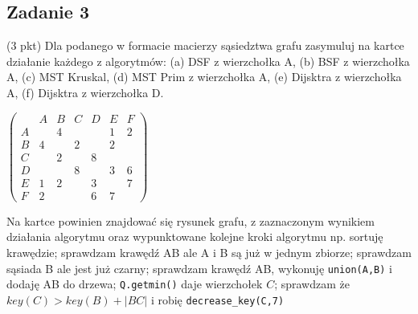\documentclass{article}
\begin{document}
\subsection*{Zadanie 3}
(3 pkt) Dla podanego w formacie macierzy sąsiedztwa grafu zasymuluj na kartce działanie
każdego z algorytmów: (a) DSF z wierzchołka A, (b) BSF z wierzchołka A, (c) MST
Kruskal, (d) MST Prim z wierzchołka A, (e) Dijsktra z wierzchołka A, (f) Dijsktra z
wierzchołka D.
\begin{center}$
        \begin{pmatrix}
              & A & B & C & D & E & F \\
            A &   & 4 &   &   & 1 & 2 \\
            B & 4 &   & 2 &   & 2 &   \\
            C &   & 2 &   & 8 &   &   \\
            D &   &   & 8 &   & 3 & 6 \\
            E & 1 & 2 &   & 3 &   & 7 \\
            F & 2 &   &   & 6 & 7 &
        \end{pmatrix}$
\end{center}
Na kartce powinien znajdować się rysunek grafu, z zaznaczonym wynikiem działania algorytmu
oraz wypunktowane kolejne kroki algorytmu np. sortuję krawędzie; sprawdzam
krawędź AB ale A i B są już w jednym zbiorze; sprawdzam sąsiada B ale jest już czarny;
sprawdzam krawędź AB, wykonuję \verb|union(A,B)| i dodaję AB do drzewa; \verb|Q.getmin()|
daje wierzchołek $C$; sprawdzam że $key(C) > key(B) + |BC|$ i robię \verb|decrease_key(C,7)|
\begin{center}
\end{center}
\end{document}
